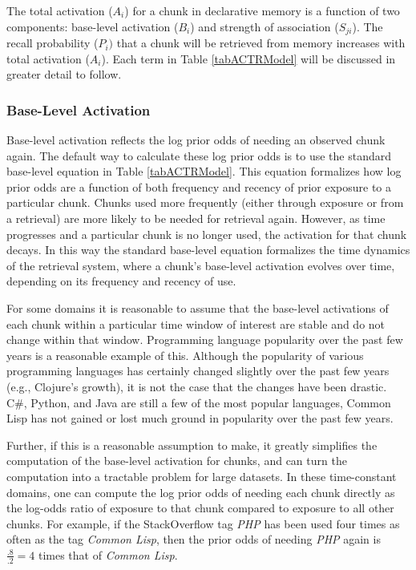 \documentclass[man,floatsintext,donotrepeattitle]{apa6}
\begin{document}
The total activation ($A_{i}$) for a chunk in declarative memory is a function of two components: base-level activation ($B_{i}$) and strength of association ($S_{ji}$).
The recall probability ($P_{i})$ that a chunk will be retrieved from memory increases with total activation ($A_{i}$).
Each term in Table \ref{tabACTRModel} will be discussed in greater detail to follow.

\subsubsection{Base-Level Activation}

Base-level activation reflects the log prior odds of needing an observed chunk again.
The default way to calculate these log prior odds is to use the standard base-level equation in Table \ref{tabACTRModel}.
This equation formalizes how log prior odds are a function of both frequency and recency of prior exposure to a particular chunk.
Chunks used more frequently (either through exposure or from a retrieval) are more likely to be needed for retrieval again.
However, as time progresses and a particular chunk is no longer used, the activation for that chunk decays.
In this way the standard base-level equation formalizes the time dynamics of the retrieval system, where a chunk's base-level activation evolves over time, depending on its frequency and recency of use.

For some domains it is reasonable to assume that the base-level activations of each chunk within a particular time window of interest are stable and do not change within that window.
Programming language popularity over the past few years is a reasonable example of this.
Although the popularity of various programming languages has certainly changed slightly over the past few years (e.g., Clojure's growth), it is not the case that the changes have been drastic.
C\#, Python, and Java are still a few of the most popular languages, Common Lisp has not gained or lost much ground in popularity over the past few years.

Further, if this is a reasonable assumption to make, it greatly simplifies the computation of the base-level activation for chunks, and can turn the computation into a tractable problem for large datasets.
In these time-constant domains, one can compute the log prior odds of needing each chunk directly as the log-odds ratio of exposure to that chunk compared to exposure to all other chunks.
For example, if the StackOverflow tag \emph{PHP} has been used four times as often as the tag \emph{Common Lisp}, then the prior odds of needing \emph{PHP} again is $\frac{.8}{.2}=4$ times that of \emph{Common Lisp}.
\end{document}
